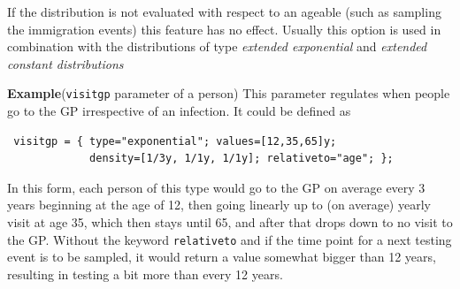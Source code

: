 \documentclass[11pt]{article}
\newenvironment{example}{\par\smallskip\noindent\begingroup\small\textbf{\small Example\enskip}}{\endgroup\par\smallskip}
\begin{document}
\begin{itemize}
If the distribution is not evaluated with respect to an ageable (such as
sampling the immigration events) this feature has no effect. Usually this option
is used in combination with the distributions of type \emph{extended
exponential} and \emph{extended constant distributions}
\begin{example}(\texttt{visitgp} parameter of a person)  This parameter
regulates when people go to the GP irrespective of an infection. It
could be defined as
\begin{verbatim}
 visitgp = { type="exponential"; values=[12,35,65]y;
             density=[1/3y, 1/1y, 1/1y]; relativeto="age"; };
\end{verbatim}
In this form, each person of this type would go to the GP on average
every 3 years beginning at the age of 12, then going linearly up to (on average)
yearly visit at age 35, which then stays until 65, and after that drops down
to no visit to the GP. Without the keyword \texttt{relativeto} and if the time
point for a next testing event is to be sampled, it would return a value
somewhat bigger than 12 years, resulting in testing a bit more than every 12
years.
\end{example}


\end{itemize}
\end{document}
